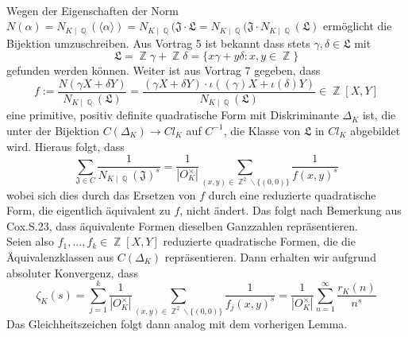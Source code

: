 \documentclass[10pt,a4paper]{article}
\DeclareMathOperator{\Q}{\mathbb{Q}}
\DeclareMathOperator{\Z}{\mathbb{Z}}
\begin{document}
\\
Wegen der Eigenschaften der Norm $N(\alpha)= N_{K\mid \Q}(\langle \alpha \rangle)=N_{K\mid \Q}(\mathfrak{J\cdot L}=N_{K\mid \Q}(\mathfrak{J}\cdot N_{K\mid \Q}(\mathfrak{L})$ ermöglicht die Bijektion umzuschreiben. Aus Vortrag 5 ist bekannt dass stets $\gamma, \delta \in \mathfrak{L}$ mit $$\mathfrak{L}= \Z\gamma+\Z\delta = \{x\gamma+y\delta\colon x,y \in \Z\}$$ gefunden werden können. Weiter ist aus Vortrag 7 gegeben, dass $$f:=\frac{N(\gamma X+\delta Y)}{N_{K\mid \Q}(\mathfrak{L})}=\frac{(\gamma X + \delta Y)\cdot \iota((\gamma)X+\iota(\delta)Y)}{N_{K\mid \Q}(\mathfrak{L})} \in \Z[X,Y]$$eine primitive, positiv definite quadratische Form mit Diskriminante $\Delta_K$ ist, die unter der Bijektion $C(\Delta_K)\rightarrow Cl_K$ auf $C^{-1}$, die Klasse von $\mathfrak{L}$ in $Cl_K$ abgebildet wird. Hieraus folgt, dass $$\sum_{\mathfrak{J}\in C}\frac{1}{N_{K\mid \Q }(\mathfrak{J})^s}=\frac{1}{|O_K^{\times}|}\sum_{(x,y)\in \Z^2\backslash \{ (0,0)\}}\frac{1}{f(x,y)^s}$$wobei sich dies durch das Ersetzen von $f$ durch eine reduzierte quadratische Form, die eigentlich äquivalent zu $f$, nicht ändert. Das folgt nach Bemerkung aus Cox.S.23, dass äquivalente Formen dieselben Ganzzahlen repräsentieren.
\\
Seien also $f_1,...,f_k \in \Z[X,Y]$ reduzierte quadratische Formen, die die Äquivalenzklassen aus $C(\Delta_K)$ repräsentieren. Dann erhalten wir aufgrund absoluter Konvergenz, dass $$\zeta_K(s) = \sum_{j=1}^{k}\frac{1}{|O_K^{\times}|}\sum_{(x,y) \in \Z^2 \backslash \{(0,0)\}}\frac{1}{f_j(x,y)^s}=\frac{1}{|O_K^{\times}|}\sum_{n=1}^{\infty}\frac{r_K(n)}{n^s}$$
Das Gleichheitszeichen folgt dann analog mit dem vorherigen Lemma.

 

\end{document}
